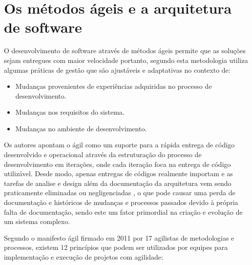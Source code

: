 \section{Os métodos ágeis e a arquitetura de software}

O desenvolvimento de software através de métodos ágeis permite que as soluções sejam entregues com maior velocidade portanto, segundo \cite{turk2014limitations} esta metodologia utiliza algumas práticas de gestão que são ajustáveis e adaptativas no contexto de:
    \begin{itemize}
        \item Mudanças provenientes de experiências adquiridas no processo de desenvolvimento.
        \item Mudanças nos requisitos do sistema.
        \item Mudanças no ambiente de desenvolvimento.
    \end{itemize}

Os autores apontam o ágil como um suporte para a rápida entrega de código desenvolvido e operacional através da estruturação do processo de desenvolvimento em iterações, onde cada iteração foca na entrega de código utilizável. Desde modo, apenas entregas de códigos realmente importam e as tarefas de analise e design além da documentação da arquitetura vem sendo praticamente eliminadas ou negligenciadas \cite{waterman2015much}, o que pode causar uma perda de documentação e históricos de mudanças e processos passados devido à própria falta de documentação, sendo este um fator primordial na criação e evolução de um sistema complexo.

Segundo o manifesto ágil \cite{manifestoagil} firmado em 2011 por 17 agilistas de metodologias e processos, existem 12 princípios que podem ser utilizados por equipes para implementação e execução de projetos com agilidade:

